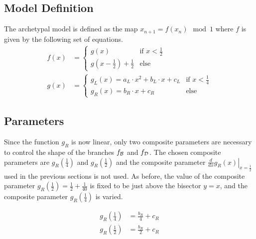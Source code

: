 \subsection{Model Definition}
\label{sec:setup.arch.definition}

The archetypal model is defined as the map $x_{n+1} = f(x_n) \mod 1$ where $f$ is given by the following set of equations.
\begin{align}
	f(x) & = \begin{cases}
		         g(x)                             & \text{if } x < \frac{1}{2} \\
		         g(x - \frac{1}{2}) + \frac{1}{2} & \text{else}
	         \end{cases} \label{equ:arch.f}           \\
	g(x) & = \begin{cases}
		         g_L(x) = a_L \cdot x^2 + b_L \cdot x + c_L & \text{if } x < \frac{1}{4} \\
		         g_R(x) = b_R \cdot x + c_R                 & \text{else}
	         \end{cases} \label{equ:arch.g}
\end{align}

\subsection{Parameters}
\label{sec:setup.arch.parameters}

Since the function $g_R$ is now linear, only two composite parameters are necessary to control the shape of the branches $f_{\mathcal{B}}$ and $f_{\mathcal{D}}$.
The chosen composite parameters are $g_R\left(\frac{1}{4}\right)$ and $g_R\left(\frac{1}{2}\right)$ and the composite parameter $\left. \frac{d}{dx} g_R(x) \right|_{x = \frac{1}{2}}$ used in the previous sections is not used.
As before, the value of the composite parameter $g_R\left(\frac{1}{2}\right) = \frac{1}{2} + \frac{1}{40}$ is fixed to be just above the bisector $y = x$, and the composite parameter $g_R\left(\frac{1}{4}\right)$ is varied.

\begin{subequations}
	\begin{align}
		g_R\left(\frac{1}{4}\right) & = \frac{b_R}{4} + c_R \label{equ:setup.arch.A} \\
		g_R\left(\frac{1}{2}\right) & = \frac{b_R}{2} + c_R \label{equ:setup.arch.B}
	\end{align}
\end{subequations}


